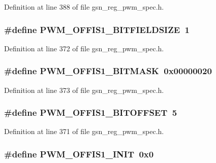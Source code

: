 Definition at line 388 of file gsn\_\-reg\_\-pwm\_\-spec.h.

\hypertarget{a00565_a8a83913942e9238413edbb1c9c4f6700}{
\subsubsection[{PWM\_\-OFFIS1\_\-BITFIELDSIZE}]{\setlength{\rightskip}{0pt plus 5cm}\#define PWM\_\-OFFIS1\_\-BITFIELDSIZE~1}}
\label{a00565_a8a83913942e9238413edbb1c9c4f6700}


Definition at line 372 of file gsn\_\-reg\_\-pwm\_\-spec.h.

\hypertarget{a00565_a2a75bc51e5dceab8d52b0273d5140b67}{
\subsubsection[{PWM\_\-OFFIS1\_\-BITMASK}]{\setlength{\rightskip}{0pt plus 5cm}\#define PWM\_\-OFFIS1\_\-BITMASK~0x00000020}}
\label{a00565_a2a75bc51e5dceab8d52b0273d5140b67}


Definition at line 373 of file gsn\_\-reg\_\-pwm\_\-spec.h.

\hypertarget{a00565_a29414f5c81a8ce89458d80e10677417b}{
\subsubsection[{PWM\_\-OFFIS1\_\-BITOFFSET}]{\setlength{\rightskip}{0pt plus 5cm}\#define PWM\_\-OFFIS1\_\-BITOFFSET~5}}
\label{a00565_a29414f5c81a8ce89458d80e10677417b}


Definition at line 371 of file gsn\_\-reg\_\-pwm\_\-spec.h.

\hypertarget{a00565_ac51bb97b6d31f24dcb93d48016952447}{
\subsubsection[{PWM\_\-OFFIS1\_\-INIT}]{\setlength{\rightskip}{0pt plus 5cm}\#define PWM\_\-OFFIS1\_\-INIT~0x0}}
\label{a00565_ac51bb97b6d31f24dcb93d48016952447}


